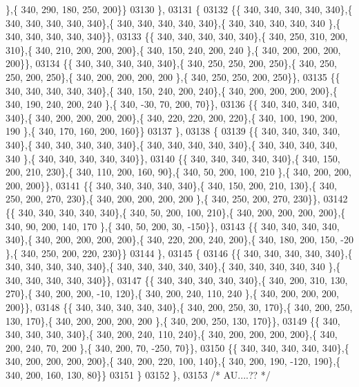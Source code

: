 \begin{DoxyCode}
      \},\{ 340, 290, 180, 250, 200\}\}
03130 \},
03131 \{
03132 \{\{ 340, 340, 340, 340, 340\},\{ 340, 340, 340, 340, 340\},\{ 340, 340, 340, 340, 340\},\{ 340, 340, 340, 340, 340
      \},\{ 340, 340, 340, 340, 340\}\},
03133 \{\{ 340, 340, 340, 340, 340\},\{ 340, 250, 310, 200, 310\},\{ 340, 210, 200, 200, 200\},\{ 340, 150, 240, 200, 240
      \},\{ 340, 200, 200, 200, 200\}\},
03134 \{\{ 340, 340, 340, 340, 340\},\{ 340, 250, 250, 200, 250\},\{ 340, 250, 250, 200, 250\},\{ 340, 200, 200, 200, 200
      \},\{ 340, 250, 250, 200, 250\}\},
03135 \{\{ 340, 340, 340, 340, 340\},\{ 340, 150, 240, 200, 240\},\{ 340, 200, 200, 200, 200\},\{ 340, 190, 240, 200, 240
      \},\{ 340, -30,  70, 200,  70\}\},
03136 \{\{ 340, 340, 340, 340, 340\},\{ 340, 200, 200, 200, 200\},\{ 340, 220, 220, 200, 220\},\{ 340, 100, 190, 200, 190
      \},\{ 340, 170, 160, 200, 160\}\}
03137 \},
03138 \{
03139 \{\{ 340, 340, 340, 340, 340\},\{ 340, 340, 340, 340, 340\},\{ 340, 340, 340, 340, 340\},\{ 340, 340, 340, 340, 340
      \},\{ 340, 340, 340, 340, 340\}\},
03140 \{\{ 340, 340, 340, 340, 340\},\{ 340, 150, 200, 210, 230\},\{ 340, 110, 200, 160,  90\},\{ 340,  50, 200, 100, 210
      \},\{ 340, 200, 200, 200, 200\}\},
03141 \{\{ 340, 340, 340, 340, 340\},\{ 340, 150, 200, 210, 130\},\{ 340, 250, 200, 270, 230\},\{ 340, 200, 200, 200, 200
      \},\{ 340, 250, 200, 270, 230\}\},
03142 \{\{ 340, 340, 340, 340, 340\},\{ 340,  50, 200, 100, 210\},\{ 340, 200, 200, 200, 200\},\{ 340,  90, 200, 140, 170
      \},\{ 340,  50, 200,  30, -150\}\},
03143 \{\{ 340, 340, 340, 340, 340\},\{ 340, 200, 200, 200, 200\},\{ 340, 220, 200, 240, 200\},\{ 340, 180, 200, 150, -20
      \},\{ 340, 250, 200, 220, 230\}\}
03144 \},
03145 \{
03146 \{\{ 340, 340, 340, 340, 340\},\{ 340, 340, 340, 340, 340\},\{ 340, 340, 340, 340, 340\},\{ 340, 340, 340, 340, 340
      \},\{ 340, 340, 340, 340, 340\}\},
03147 \{\{ 340, 340, 340, 340, 340\},\{ 340, 200, 310, 130, 270\},\{ 340, 200, 200, -10, 120\},\{ 340, 200, 240, 110, 240
      \},\{ 340, 200, 200, 200, 200\}\},
03148 \{\{ 340, 340, 340, 340, 340\},\{ 340, 200, 250,  30, 170\},\{ 340, 200, 250, 130, 170\},\{ 340, 200, 200, 200, 200
      \},\{ 340, 200, 250, 130, 170\}\},
03149 \{\{ 340, 340, 340, 340, 340\},\{ 340, 200, 240, 110, 240\},\{ 340, 200, 200, 200, 200\},\{ 340, 200, 240,  70, 200
      \},\{ 340, 200,  70, -250,  70\}\},
03150 \{\{ 340, 340, 340, 340, 340\},\{ 340, 200, 200, 200, 200\},\{ 340, 200, 220, 100, 140\},\{ 340, 200, 190, -120, 
      190\},\{ 340, 200, 160, 130,  80\}\}
03151 \}
03152 \},
03153 \textcolor{comment}{/* AU....?? */}

\end{DoxyCode}
